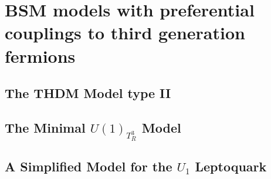 \chapter{BSM models with preferential couplings to third generation fermions}
\lipsum

\section{The THDM Model type II}
\lipsum

\section{The Minimal $U(1)_{T^3_R}$ Model}
\lipsum

\section{A Simplified Model for the $U_1$ Leptoquark}
\lipsum